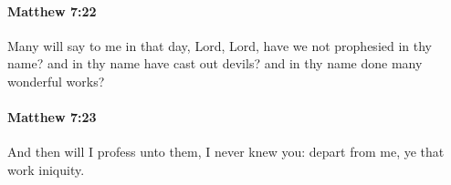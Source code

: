 		\paragraph{Matthew 7:22} %
			\label{MATTHEW-7-22}

			Many will say to me in that day, Lord, Lord, have we not prophesied in thy name? and in thy name have cast out devils? and in thy name done many wonderful works?

			\begin{framed}
			\scriptsize
				\begin{compactdesc}
					\item[SBLG] 
				\end{compactdesc}
			\end{framed}

		\paragraph{Matthew 7:23} %
			\label{MATTHEW-7-23}

			And then will I profess unto them, I never knew you: depart from me, ye that work iniquity.

